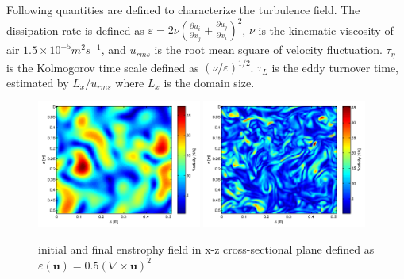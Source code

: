 \documentclass[12pt]{article}
\begin{document}
Following quantities are defined to characterize the turbulence field. 
The dissipation rate is defined as $\varepsilon=2\nu(\frac{\partial u_{i}}{\partial x_{j}}+\frac{\partial u_{j}}{\partial x_{i}})^{2}$,
$\nu$ is the kinematic viscosity of air $1.5\times10^{-5}m^{2}s^{-1}$, and $u_{rms}$
is the root mean square of velocity fluctuation. $\tau_{\eta}$ is
the Kolmogorov time scale defined as $(\nu/\varepsilon)^{1/2}$. $\tau_L$
is the eddy turnover time, estimated by $L_x/u_{rms}$
where $L_x$ is the domain size.

\begin{figure}[H]
\includegraphics[width=0.48\textwidth]{Figures/vortex-0}
\includegraphics[width=0.48\textwidth]{Figures/vortex-1}

\caption{initial and final enstrophy field in x-z cross-sectional
plane defined as $\varepsilon(\mathbf{u}) = 0.5(\nabla\times\mathbf{u})^2$\label{fig:enstrophy}}
\end{figure}
\end{document}
